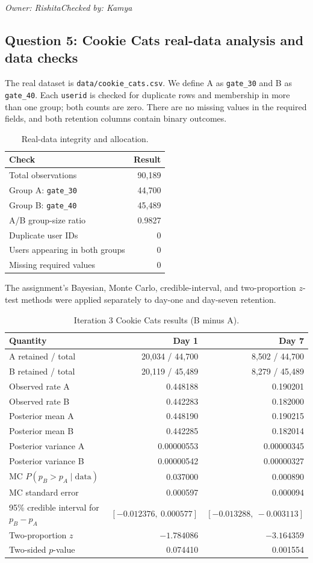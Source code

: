 \documentclass[11pt]{article}
\newcommand{\signoff}[2]{\par\smallskip\noindent\textit{Owner: #1\quad Checked by: #2}\par}
\begin{document}
\signoff{Rishita}{Kamya}

\subsection{Question 5: Cookie Cats real-data analysis and data checks}
The real dataset is \texttt{data/cookie\_cats.csv}. We define A as \texttt{gate\_30} and B as \texttt{gate\_40}. Each \texttt{userid} is checked for duplicate rows and membership in more than one group; both counts are zero. There are no missing values in the required fields, and both retention columns contain binary outcomes.
\begin{table}[H]\centering
\caption{Real-data integrity and allocation.}
\begin{tabular}{lr}\toprule
Check & Result\\\midrule
Total observations & 90,189\\
Group A: \texttt{gate\_30} & 44,700\\
Group B: \texttt{gate\_40} & 45,489\\
A/B group-size ratio & 0.9827\\
Duplicate user IDs & 0\\
Users appearing in both groups & 0\\
Missing required values & 0\\\bottomrule
\end{tabular}
\end{table}
The assignment's Bayesian, Monte Carlo, credible-interval, and two-proportion $z$-test methods were applied separately to day-one and day-seven retention.
\begin{table}[H]\centering\small
\caption{Iteration 3 Cookie Cats results (B minus A).}\label{tab:iter3real}
\begin{tabular}{lrr}\toprule
Quantity & Day 1 & Day 7\\\midrule
A retained / total & 20,034 / 44,700 & 8,502 / 44,700\\
B retained / total & 20,119 / 45,489 & 8,279 / 45,489\\
Observed rate A & 0.448188 & 0.190201\\
Observed rate B & 0.442283 & 0.182000\\
Posterior mean A & 0.448190 & 0.190215\\
Posterior mean B & 0.442285 & 0.182014\\
Posterior variance A & 0.00000553 & 0.00000345\\
Posterior variance B & 0.00000542 & 0.00000327\\
MC $P(p_B>p_A\mid\mathrm{data})$ & 0.037000 & 0.000890\\
MC standard error & 0.000597 & 0.000094\\
95\% credible interval for $p_B-p_A$ & $[-0.012376,\ 0.000577]$ & $[-0.013288,\ -0.003113]$\\
Two-proportion $z$ & $-1.784086$ & $-3.164359$\\
Two-sided $p$-value & 0.074410 & 0.001554\\\bottomrule
\end{tabular}
\end{table}
\end{document}
